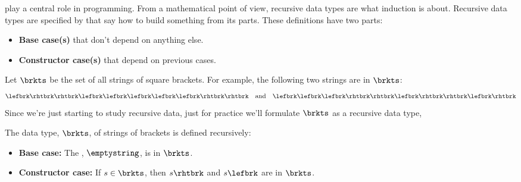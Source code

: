 \label{recursive_data_chapter}

 play a central role in programming.  From a
mathematical point of view, recursive data types are what induction is
about.  Recursive data types are specified by 
that say how to build something from its parts.  These definitions have
two parts:
\begin{itemize}
\item \textbf{Base case(s)} that don't depend on anything else.
\item \textbf{Constructor case(s)} that depend on previous cases.
\end{itemize}


Let $\brkts$ be the set of all strings of square brackets.  For example,
the following two strings are in $\brkts$:
\begin{equation}\label{2strings}
\lefbrk\rhtbrk\rhtbrk\lefbrk\lefbrk\lefbrk\lefbrk\lefbrk\rhtbrk\rhtbrk\quad \text{and}\quad \lefbrk\lefbrk\lefbrk\rhtbrk\rhtbrk\lefbrk\rhtbrk\rhtbrk\lefbrk\rhtbrk
\end{equation}
Since we're just starting to study recursive data, just for practice we'll
formulate $\brkts$ as a recursive data type,

\begin{definition}\label{prns-def}
The data type, $\brkts$, of strings of brackets is defined recursively:

\begin{itemize}

\item \textbf{Base case:} The , $\emptystring$, is in
  $\brkts$.

\item \textbf{Constructor case:} If $s \in \brkts$, then
$s\rhtbrk$ and $s\lefbrk$ are in $\brkts$.

\end{itemize}

\end{definition}

